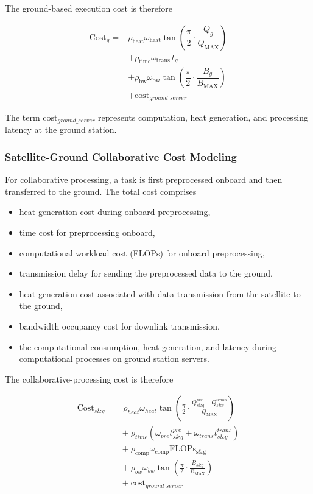 \documentclass[lettersize,journal]{IEEEtran}
\begin{document}
The ground-based execution cost is therefore

\begin{equation}
\begin{aligned}
\mathrm{Cost}_{g} = {} & \rho_{\mathrm{heat}}\omega_{\mathrm{heat}}
\tan\!\left(\dfrac{\pi}{2}\cdot\dfrac{Q_g}{Q_{\mathrm{MAX}}}\right) \\
& + \rho_{\mathrm{time}}\omega_{\mathrm{trans}}\, t_{g} \\
& + \rho_{\mathrm{bw}}\omega_{\mathrm{bw}}
\tan\!\left(\dfrac{\pi}{2}\cdot\dfrac{B_g}{B_{\mathrm{MAX}}}\right)\\
& + \mathrm{cost}_{ground\_server}
\end{aligned}
\label{eq:ground_cost}
\end{equation}

The term $\mathrm{cost}_{ground\_server}$ represents computation, heat generation, and processing latency at the ground station.

\subsubsection{Satellite-Ground Collaborative Cost Modeling}

For collaborative processing, a task is first preprocessed onboard and then transferred to the ground. The total cost comprises
\begin{itemize}
    \item heat generation cost during onboard preprocessing,  
    \item time cost for preprocessing onboard,  
    \item computational workload cost (FLOPs) for onboard preprocessing,  
    \item transmission delay for sending the preprocessed data to the ground,  
    \item heat generation cost associated with data transmission from the satellite to the ground,  
    \item bandwidth occupancy cost for downlink transmission. 
    \item the computational consumption, heat generation, and latency during computational processes on ground station servers. 
\end{itemize}

The collaborative-processing cost is therefore

\begin{equation}
\begin{aligned}
\mathrm{Cost}_{s\&g} &= \rho_{heat} \omega_{heat}
\tan\!\left(\frac{\pi}{2}\cdot\frac{Q^{pre}_{s\&g}+Q^{trans}_{s\&g}}{Q_{\mathrm{MAX}}}\right) \\
&\quad + \rho_{time} \left( \omega_{pre} t^{pre}_{s\&g} 
+ \omega_{trans} t^{trans}_{s\&g} \right) \\
&\quad + \rho_{\mathrm{comp}}\omega_{\mathrm{comp}}
\mathrm{FLOPs_{s\&g}} \\
&\quad + \rho_{bw} \omega_{bw}
\tan\!\left(\frac{\pi}{2}\cdot\frac{B_{s\&g}}{B_{\mathrm{MAX}}}\right)\\
&\quad + \mathrm{cost}_{ground\_server}
\end{aligned}
\label{eq:sg_cost}
\end{equation}
\end{document}
